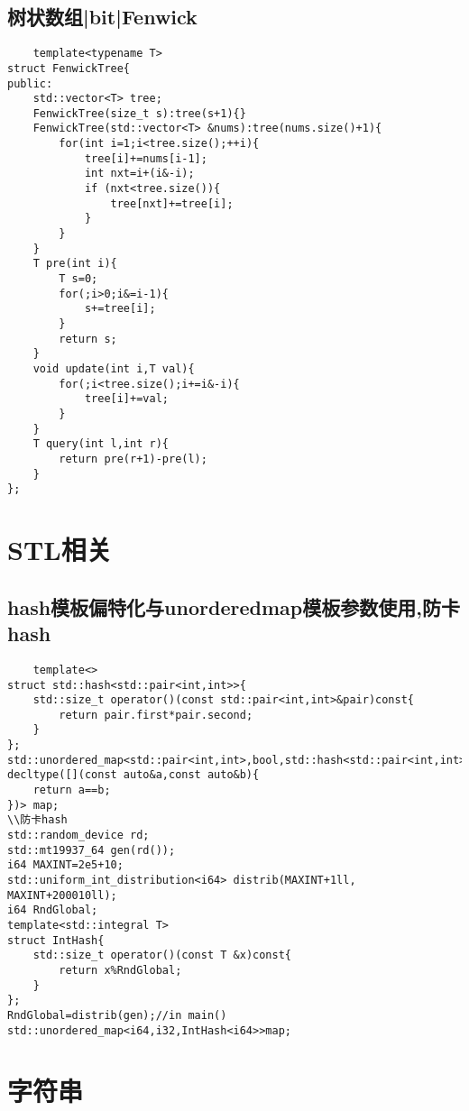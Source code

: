 \documentclass[UTF8]{ctexart}
\begin{document}
\subsection{树状数组|bit|Fenwick}
\begin{lstlisting}
    template<typename T>
struct FenwickTree{
public:
    std::vector<T> tree;
    FenwickTree(size_t s):tree(s+1){}
    FenwickTree(std::vector<T> &nums):tree(nums.size()+1){
        for(int i=1;i<tree.size();++i){
            tree[i]+=nums[i-1];
            int nxt=i+(i&-i);
            if (nxt<tree.size()){
                tree[nxt]+=tree[i];
            }
        }
    }
    T pre(int i){
        T s=0;
        for(;i>0;i&=i-1){
            s+=tree[i];
        }
        return s;
    }
    void update(int i,T val){
        for(;i<tree.size();i+=i&-i){
            tree[i]+=val;
        }
    }
    T query(int l,int r){
        return pre(r+1)-pre(l);
    }
};
\end{lstlisting}
\section{STL相关}
\subsection{hash模板偏特化与unorderedmap模板参数使用,防卡hash}
\begin{lstlisting}
    template<>
struct std::hash<std::pair<int,int>>{
    std::size_t operator()(const std::pair<int,int>&pair)const{
        return pair.first*pair.second;
    }
};
std::unordered_map<std::pair<int,int>,bool,std::hash<std::pair<int,int>>, decltype([](const auto&a,const auto&b){
    return a==b;
})> map;
\\防卡hash
std::random_device rd;
std::mt19937_64 gen(rd());
i64 MAXINT=2e5+10;
std::uniform_int_distribution<i64> distrib(MAXINT+1ll, MAXINT+200010ll);
i64 RndGlobal;
template<std::integral T>
struct IntHash{
    std::size_t operator()(const T &x)const{
        return x%RndGlobal;
    }
};
RndGlobal=distrib(gen);//in main()
std::unordered_map<i64,i32,IntHash<i64>>map;
\end{lstlisting}
\section{字符串}
\end{document}
